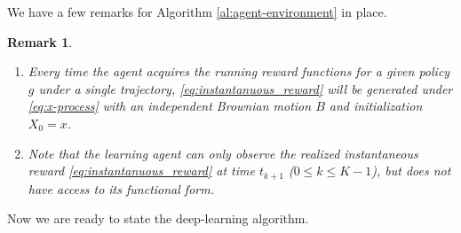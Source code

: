 \documentclass[11pt]{amsart}
\newtheorem{remark}[theorem]{Remark}
\theoremstyle{plain}
\numberwithin{equation}{section}
\begin{document}
We have a few remarks for Algorithm \ref{al:agent-environment} in place. 
\begin{remark} \
\begin{enumerate}
    \item  Every time the agent acquires the running reward functions for a given policy $g$ under a single trajectory, \eqref{eq:instantanuous_reward} will be generated under \eqref{eq:x-process} with an independent Brownian motion $B$ and initialization $X_0=x$.

\item Note that the learning agent can only observe the realized instantaneous reward \eqref{eq:instantanuous_reward} at time $t_{k+1}$ ($0\leq k\leq K-1$), but does not have access to its functional form.  
\end{enumerate}
 
\end{remark}






Now we are ready to state the deep-learning algorithm.
\end{document}
